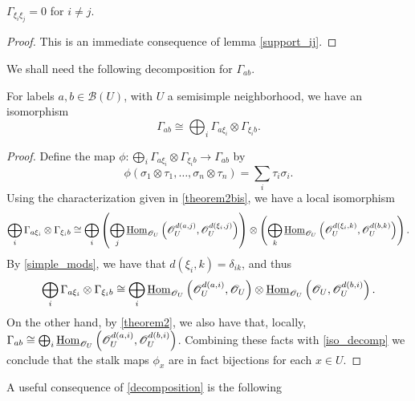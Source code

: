 \begin{lemma}\label{simple_mods}
$\Gamma_{\xi_i\xi_j}=0$ for $i\neq j$.
\end{lemma}
\begin{proof}
This is an immediate consequence of lemma \ref{support_ij}.
\end{proof}

We shall need the following decomposition for $\Gamma_{ab}$.

\begin{proposition}\label{decomposition}
For labels $a,b\in \mathscr{B}(U)$, with $U$ a semisimple neighborhood, we have an isomorphism
$$\Gamma_{ab}\cong \bigoplus_i\Gamma_{a\xi_i}\otimes\Gamma_{\xi_ib}.$$
\end{proposition}
\begin{proof}
Define the map $\phi :\bigoplus_i\Gamma_{a\xi_i}\otimes\Gamma_{\xi_ib}\rightarrow\Gamma_{ab}$ by
\begin{equation}\label{iso_decomp}
\phi (\sigma_1\otimes \tau_1,\dots ,\sigma_n\otimes \tau_n)=\sum_i\tau_i\sigma_i.
\end{equation}
Using the characterization given in \ref{theorem2bis}, we have a local isomorphism
$$
\bigoplus_i\Gamma_{a\xi_i}\otimes\Gamma_{\xi_ib} \cong \bigoplus_i \left (\bigoplus_j\underline{\operatorname{Hom}}_{\mathscr{O}_U}\left (\mathscr{O}_U^{d(a,j)},\mathscr{O}_U^{d(\xi_i,j)}\right )\right )\otimes \left (\bigoplus_k\underline{\operatorname{Hom}}_{\mathscr{O}_U}\left (\mathscr{O}_U^{d(\xi_i,k)},\mathscr{O}_U^{d(b,k)}\right )\right ).
$$
By \ref{simple_mods}, we have that $d(\xi_i,k)=\delta_{ik}$, and thus
$$
\bigoplus_i\Gamma_{a\xi_i}\otimes\Gamma_{\xi_ib} \cong \bigoplus_i \underline{\operatorname{Hom}}_{\mathscr{O}_U}\left (\mathscr{O}_U^{d(a,i)},\mathscr{O}_U\right )\otimes \underline{\operatorname{Hom}}_{\mathscr{O}_U}\left (\mathscr{O}_U,\mathscr{O}_U^{d(b,i)}\right ).
$$
On the other hand, by \ref{theorem2}, we also have that, locally, $\Gamma_{ab}\cong \bigoplus_i\underline{\operatorname{Hom}}_{\mathscr{O}_U}\left (\mathscr{O}_U^{d(a,i)},\mathscr{O}_U^{d(b,i)}\right )$. Combining these facts with \eqref{iso_decomp} we conclude that the stalk maps $\phi_x$ are in fact bijections for each $x\in U$.  
\end{proof}

A useful consequence of \ref{decomposition} is the following

